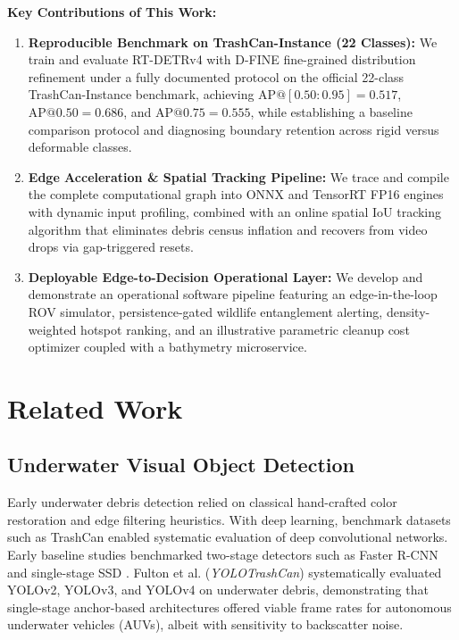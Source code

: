 \documentclass[conference]{IEEEtran}
\begin{document}
\textbf{Key Contributions of This Work:}
\begin{enumerate}
    \item \textbf{Reproducible Benchmark on TrashCan-Instance (22 Classes):} We train and evaluate RT-DETRv4 with D-FINE fine-grained distribution refinement under a fully documented protocol on the official 22-class TrashCan-Instance benchmark, achieving $\text{AP}@[0.50:0.95] = 0.517$, $\text{AP}@0.50 = 0.686$, and $\text{AP}@0.75 = 0.555$, while establishing a baseline comparison protocol and diagnosing boundary retention across rigid versus deformable classes.
    \item \textbf{Edge Acceleration \& Spatial Tracking Pipeline:} We trace and compile the complete computational graph into ONNX and TensorRT FP16 engines with dynamic input profiling, combined with an online spatial IoU tracking algorithm that eliminates debris census inflation and recovers from video drops via gap-triggered resets.
    \item \textbf{Deployable Edge-to-Decision Operational Layer:} We develop and demonstrate an operational software pipeline featuring an edge-in-the-loop ROV simulator, persistence-gated wildlife entanglement alerting, density-weighted hotspot ranking, and an illustrative parametric cleanup cost optimizer coupled with a bathymetry microservice.
\end{enumerate}

\section{Related Work}

\subsection{Underwater Visual Object Detection}
Early underwater debris detection relied on classical hand-crafted color restoration and edge filtering heuristics. With deep learning, benchmark datasets such as TrashCan \cite{trashcan} enabled systematic evaluation of deep convolutional networks. Early baseline studies benchmarked two-stage detectors such as Faster R-CNN \cite{fasterrcnn} and single-stage SSD \cite{ssd}. Fulton et al. (\textit{YOLOTrashCan}) \cite{yolotrashcan} systematically evaluated YOLOv2, YOLOv3, and YOLOv4 on underwater debris, demonstrating that single-stage anchor-based architectures offered viable frame rates for autonomous underwater vehicles (AUVs), albeit with sensitivity to backscatter noise.
\end{document}
